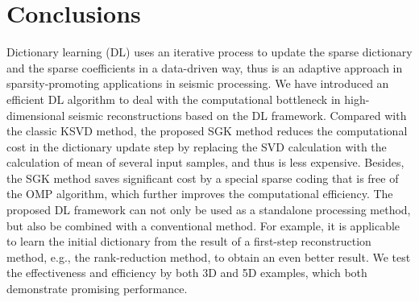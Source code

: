 

\section{Conclusions}
Dictionary learning (DL) uses an iterative process to update the sparse dictionary and the sparse coefficients in a data-driven way, thus is an adaptive approach in sparsity-promoting applications in seismic processing. We have introduced an efficient DL algorithm to deal with the computational bottleneck in high-dimensional seismic reconstructions based on the DL framework. Compared with the classic KSVD method, the proposed SGK method reduces the computational cost in the dictionary update step by replacing the SVD calculation with the calculation of mean of several input samples, and thus is less expensive. Besides, the SGK method saves significant cost by a special sparse coding that is free of the OMP algorithm, which further improves the computational efficiency. The proposed DL framework can not only be used as a standalone processing method, but also be combined with a conventional method. For example, it is applicable to learn the initial dictionary from the result of a first-step reconstruction method, e.g., the rank-reduction method, to obtain an even better result. We test the effectiveness and efficiency by both 3D and 5D examples, which both demonstrate promising performance. 

